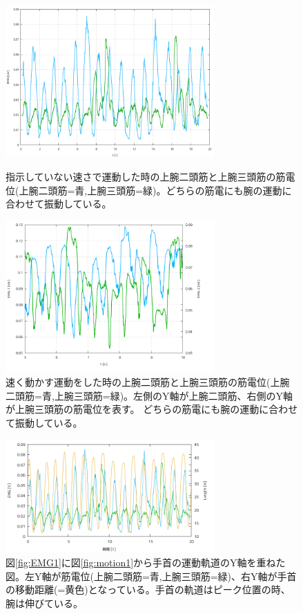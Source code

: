 \documentclass{jsarticle}
\begin{document}
\begin{figure}[htbp]
  \begin{minipage}{0.5\hsize}
    \begin{center}
      \includegraphics[clip,width=80mm]{Graph_4.png}
      \caption{指示していない速さで運動した時の上腕二頭筋と上腕三頭筋の筋電位(上腕二頭筋=青,上腕三頭筋=緑)。どちらの筋電にも腕の運動に合わせて振動している。 \label{fig:EMG1}}
    \end{center}
  \end{minipage}
  \begin{minipage}{0.5\hsize}
    \begin{center}
      \includegraphics[clip,width=80mm]{Graph_5.png}
      \caption{速く動かす運動をした時の上腕二頭筋と上腕三頭筋の筋電位(上腕二頭筋=青,上腕三頭筋=緑)。左側のY軸が上腕二頭筋、右側のY軸が上腕三頭筋の筋電位を表す。 どちらの筋電にも腕の運動に合わせて振動している。\label{fig:EMG2}}
    \end{center}
  \end{minipage}
\end{figure}

\begin{figure}[htbp]
  \begin{center}
    \includegraphics[clip,width=80mm]{Graph_6.png}
    \caption{図\ref{fig:EMG1}に図\ref{fig:motion1}から手首の運動軌道のY軸を重ねた図。左Y軸が筋電位(上腕二頭筋=青,上腕三頭筋=緑)、右Y軸が手首の移動距離(=黄色)となっている。手首の軌道はピーク位置の時、腕は伸びている。\label{fig:+length}}
  \end{center}
\end{figure}
\end{document}
